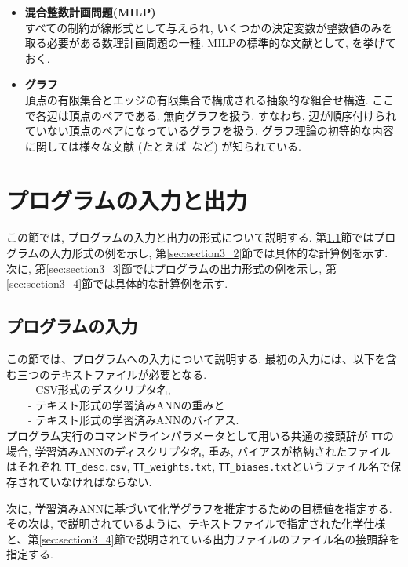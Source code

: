 \documentclass[11pt, titlepage, dvipdfmx, twoside]{jarticle}
\newcommand{\target}{目標}
\begin{document}
\begin{itemize}
\item {\bf 混合整数計画問題(MILP)}\\
%
すべての制約が線形式として与えられ, 
いくつかの決定変数が整数値のみを取る必要がある数理計画問題の一種. 
MILPの標準的な文献として, \cite{LP}を挙げておく.  

\item {\bf グラフ}\\
頂点の有限集合とエッジの有限集合で構成される抽象的な組合せ構造. ここで各辺は頂点のペアである. 
無向グラフを扱う. すなわち, 辺が順序付けられていない頂点のペアになっているグラフを扱う. 
グラフ理論の初等的な内容に関しては様々な文献 (たとえば~\cite{graph}など) が知られている. 

\end{itemize}


\section{プログラムの入力と出力}
\label{sec:InOut}

この節では, プログラムの入力と出力の形式について説明する. 
第\ref{sec:section3_1}節ではプログラムの入力形式の例を示し, 
第\ref{sec:section3_2}節では具体的な計算例を示す. 
次に, 第\ref{sec:section3_3}節ではプログラムの出力形式の例を示し, 
第\ref{sec:section3_4}節では具体的な計算例を示す. 


\subsection{プログラムの入力}
\label{sec:section3_1}

この節では、プログラムへの入力について説明する. 
最初の入力には、以下を含む三つのテキストファイルが必要となる.  \\
~~~~- CSV形式のデスクリプタ名,  \\
~~~~- テキスト形式の学習済みANNの重みと\\
~~~~- テキスト形式の学習済みANNのバイアス.  \\

プログラム実行のコマンドラインパラメータとして用いる共通の接頭辞が {\tt TT}の場合, 学習済みANNのディスクリプタ名, 重み, バイアスが格納されたファイルはそれぞれ {\tt TT\_desc.csv}, {\tt TT\_weights.txt},  {\tt TT\_biases.txt}というファイル名で保存されていなければならない. 

%
次に, 学習済みANNに基づいて化学グラフを推定するための\target 値を指定する. 
その次は, \cite{cyclic_BH_arxiv}で説明されているように、テキストファイルで指定された化学仕様と、第\ref{sec:section3_4}節で説明されている出力ファイルのファイル名の接頭辞を指定する. 
\end{document}
